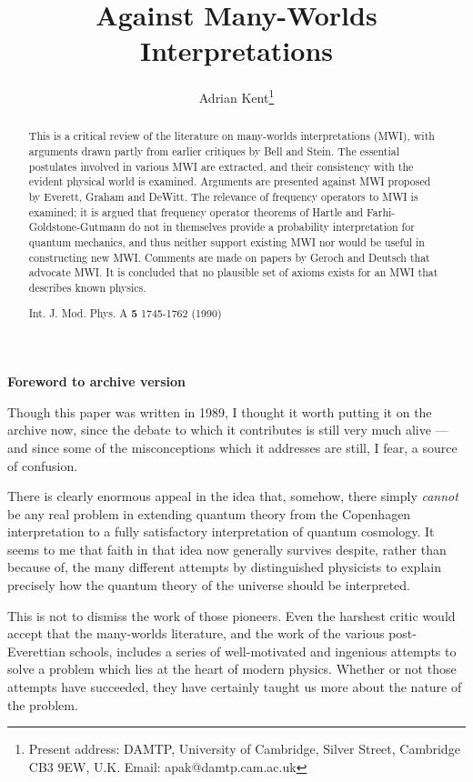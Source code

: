\documentclass[aps,pra,12pt]{revtex4}
\begin{document}
\title{Against Many-Worlds Interpretations}
\author{Adrian Kent\thanks{Present address: DAMTP, University of
    Cambridge, Silver Street, Cambridge CB3 9EW, U.K.\hfill\break
Email: apak@damtp.cam.ac.uk}}
\address{The Institute for Advanced Study, School of Natural Sciences,\\
Princeton, New Jersey 08540, USA}
\begin{abstract}
This is a critical review of the literature on many-worlds interpretations 
(MWI), with arguments drawn partly from earlier critiques by Bell and Stein.
The essential postulates involved in various MWI
are extracted, and their consistency with the evident physical world is
examined. 
Arguments are presented against MWI proposed by Everett, Graham and DeWitt.
The relevance of frequency operators to MWI is examined; it is argued
that frequency operator theorems of Hartle and
Farhi-Goldstone-Gutmann do not in themselves provide a probability 
interpretation for quantum mechanics, and thus neither support existing MWI 
nor would be useful in constructing new MWI. 
Comments are made on papers by Geroch and Deutsch that advocate MWI.
It is concluded that no plausible set of axioms exists for an MWI that
describes known physics.

Int. J. Mod. Phys. A {\bf 5} 1745-1762 (1990)
\end{abstract} 

\maketitle

\centerline{\bf Foreword to archive version}
\vskip 10pt

Though this paper was written in 1989, I thought it worth 
putting it on the archive now, since the debate to which it contributes is 
still very much alive --- and since some of the misconceptions 
which it addresses are still, I fear, a source of confusion.   

There is clearly enormous appeal in the idea that, somehow, there 
simply {\it cannot} be any real problem in extending 
quantum theory from the Copenhagen interpretation to a 
fully satisfactory interpretation of quantum cosmology. 
It seems to me that faith in that idea now generally survives 
despite, rather than because of, the many different attempts by 
distinguished physicists to explain precisely how the quantum
theory of the universe should be interpreted.  

This is not to dismiss the work of those pioneers. 
Even the harshest critic would accept that the many-worlds 
literature, and the work of the various post-Everettian schools,
includes a series of well-motivated and ingenious attempts 
to solve a problem which lies at the heart of modern physics.  
Whether or not those attempts have succeeded, they have certainly 
taught us more about the nature of the problem.  
\end{document}
